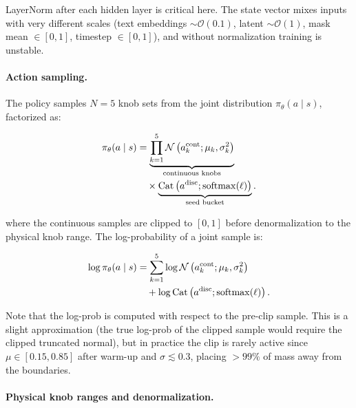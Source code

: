 LayerNorm after each hidden layer is critical here.
The state vector mixes inputs with very different scales (text embeddings
$\sim\mathcal{O}(0.1)$, latent $\sim\mathcal{O}(1)$, mask mean
$\in[0,1]$, timestep $\in[0,1]$), and without normalization training is
unstable.

\paragraph{Action sampling.}

The policy samples $N=5$ knob sets from the joint distribution
$\pi_\theta(a \mid s)$, factorized as:

\begin{equation}
\begin{aligned}
\pi_\theta(a \mid s)
&=
\underbrace{
\prod_{k=1}^{5}
\mathcal{N}
\left(
a_k^{\mathrm{cont}};
\mu_k,\sigma_k^2
\right)
}_{\text{continuous knobs}}
\\
&\quad \times
\underbrace{
\mathrm{Cat}
\left(
a^{\mathrm{disc}};
\mathrm{softmax}(\ell)
\right)
}_{\text{seed bucket}} .\notag
\end{aligned}
\end{equation}

where the continuous samples are clipped to $[0,1]$
before denormalization to the physical knob range.
The log-probability of a joint sample is:

\begin{equation}
\begin{aligned}
\log \pi_\theta(a \mid s)
&=
\sum_{k=1}^{5}
\log
\mathcal{N}
\left(
a_k^{\mathrm{cont}};
\mu_k,\sigma_k^2
\right)
\\
&\quad +
\log
\mathrm{Cat}
\left(
a^{\mathrm{disc}};
\mathrm{softmax}(\ell)
\right).\notag
\end{aligned}
\end{equation}

Note that the log-prob is computed with respect to the pre-clip sample.
This is a slight approximation (the true log-prob of the clipped sample
would require the clipped truncated normal), but in practice the clip is
rarely active since $\mu \in [0.15, 0.85]$ after warm-up and
$\sigma \lesssim 0.3$, placing $> 99\%$ of mass away from the boundaries.

\paragraph{Physical knob ranges and denormalization.}

